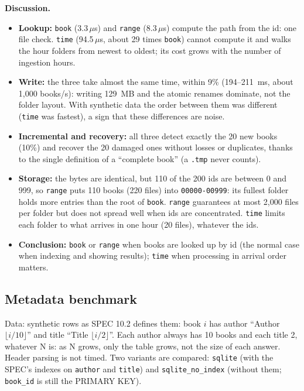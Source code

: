 \documentclass[11pt,a4paper]{article}
\newcommand{\code}[1]{\texttt{#1}}
\newcommand{\us}{\,$\mu$s}
\begin{document}
\textbf{Discussion.}
\begin{itemize}
  \item \textbf{Lookup:} \code{book} (3.3\us) and \code{range} (8.3\us) compute the path from the id:
        one file check. \code{time} (94.5\us, about 29 times \code{book}) cannot compute it and walks
        the hour folders from newest to oldest; its cost grows with the number of ingestion hours.
  \item \textbf{Write:} the three take almost the same time, within 9\% (194--211~ms, about 1,000
        books/s): writing 129~MB and the atomic renames dominate, not the folder layout. With
        synthetic data the order between them was different (\code{time} was fastest), a sign that
        these differences are noise.
  \item \textbf{Incremental and recovery:} all three detect exactly the 20 new books (10\%) and
        recover the 20 damaged ones without losses or duplicates, thanks to the single definition of
        a ``complete book'' (a \code{.tmp} never counts).
  \item \textbf{Storage:} the bytes are identical, but 110 of the 200 ids are between 0 and 999, so
        \code{range} puts 110 books (220 files) into \code{00000-00999}: its fullest folder holds
        more entries than the root of \code{book}. \code{range} guarantees at most 2,000 files per
        folder but does not spread well when ids are concentrated. \code{time} limits each folder to
        what arrives in one hour (20 files), whatever the ids.
  \item \textbf{Conclusion:} \code{book} or \code{range} when books are looked up by id (the normal
        case when indexing and showing results); \code{time} when processing in arrival order
        matters.
\end{itemize}

\subsection{Metadata benchmark}
Data: synthetic rows as SPEC 10.2 defines them: book $i$ has author ``Author $\lfloor i/10\rfloor$''
and title ``Title $\lfloor i/2\rfloor$''. Each author always has 10 books and each title 2,
whatever N is: as N grows, only the table grows, not the size of each answer. Header parsing is not
timed. Two variants are compared: \code{sqlite} (with the SPEC's indexes on \code{author} and
\code{title}) and \code{sqlite\_no\_index} (without them; \code{book\_id} is still the PRIMARY KEY).
\end{document}
